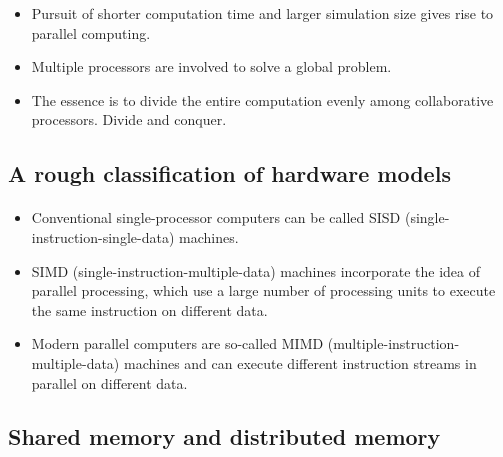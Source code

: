 \documentclass[%
twoside,                 %
final,                   %
10pt]{article}
\begin{document}
\begin{itemize}
\item Pursuit of shorter computation time and larger simulation size gives rise to parallel computing.

\item Multiple processors are involved to solve a global problem.

\item The essence is to divide the entire computation evenly among collaborative processors.  Divide and conquer.
\end{itemize}

\noindent



\subsection{A rough classification of hardware models}

\paragraph{}

\begin{itemize}
\item Conventional single-processor computers can be called SISD (single-instruction-single-data) machines.

\item SIMD (single-instruction-multiple-data) machines incorporate the idea of parallel processing, which use a large number of processing units to execute the same instruction on different data.

\item Modern parallel computers are so-called MIMD (multiple-instruction-multiple-data) machines and can execute different instruction streams in parallel on different data.
\end{itemize}

\noindent


\subsection{Shared memory and distributed memory}

\paragraph{}
\end{document}
